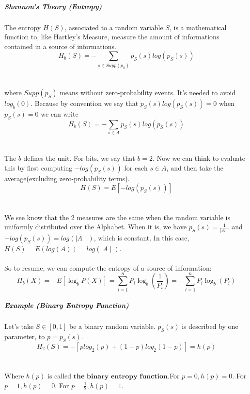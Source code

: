 \documentclass{article}
\begin{document}
\subparagraph{Shannon's Theory (Entropy)} The entropy $ H(S) $, associated to a random variable $ S $, is a mathematical function to, like Hartley's Measure, measure the amount of informations contained in a source of informations.
\begin{equation}
H_b(S) = - \sum_{s \in Supp(p_S)}p_S(s)log(p_S(s))
\end{equation}
\\
\\
where $ Supp(p_S) $ means without zero-probability events. It's needed to avoid $ log_b(0) $. Because by convention we say that $ p_S(s)log(p_S(s)) = 0 $ when $ p_S(s) = 0 $ we can write
\begin{equation}
H_b(S) = - \sum_{s \in A}p_S(s)log(p_S(s))
\end{equation}
\\
\\
The $ b $ defines the unit. For bits, we say that $ b = 2 $. Now we can think to evaluate this by first computing $ -log(p_S(s)) $ for each $ s \in A $, and then take the average(excluding zero-probability terms).
\begin{equation}
H(S) = E[-log(p_S(s))]
\end{equation}
\\
\\
We see know that the 2 measures are the same when the random variable is uniformly distributed over the Alphabet. When it is, we have $ p_S(s) = \frac{1}{\mid A \mid} $ and $ -log(p_S(s)) = log(\mid A \mid) $, which is constant. In this case, $ H(S) = E(log(A)) = log(\mid A \mid) $.
\\
\\
So to resume, we can compute the entropy of a source of information:
\begin{equation}
H_b(X) = -E[\log_bP(X)] = \sum_{i=1}^{n}P_i\log_b(\frac{1}{P_i}) = - \sum_{i=1}^{n}P_i\log_b(P_i)
\end{equation}

\subparagraph{Example (Binary Entropy Function)} Let's take $ S \in [0, 1] $ be a binary random variable. $ p_S(s) $ is described by one parameter, to $ p = p_S(s) $.
\begin{equation}
H_2(S) = - [plog_2(p) + (1-p)log_2(1-p)] = h(p)
\end{equation}
\\
\\
Where $ h(p) $ is called $ \textbf{the binary entropy function} $.For $ p = 0, h(p) = 0 $. For $ p = 1, h(p) = 0 $. For $ p = \frac{1}{2}, h(p) = 1 $.
\\
\\
\end{document}
